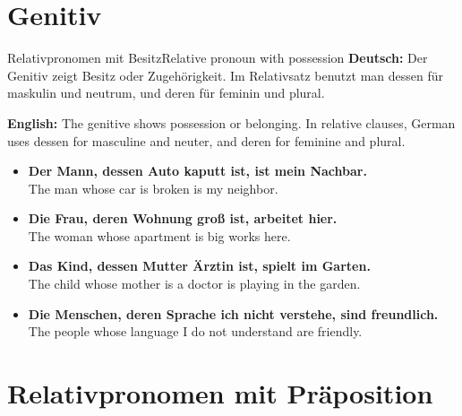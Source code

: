 \documentclass[a4paper,11pt]{article}
\newcommand{\GermanText}[1]{\textbf{Deutsch: }#1\par}
\newcommand{\EnglishText}[1]{{\small\color{SoftGray}\textbf{English: }#1\par}}
\newcommand{\ExampleItem}[2]{\item \textbf{#1}\\{\small\color{SoftGray}#2}}
\begin{document}
    
    \section{Genitiv}
        
        \begin{grammarentry}{Relativpronomen mit Besitz}{Relative pronoun with possession}
            \GermanText{Der Genitiv zeigt Besitz oder Zugehörigkeit. Im Relativsatz benutzt man dessen für maskulin und neutrum, und deren für feminin und plural.}
            \EnglishText{The genitive shows possession or belonging. In relative clauses, German uses dessen for masculine and neuter, and deren for feminine and plural.}
            
            \begin{exbox}
                \begin{itemize}
                    \ExampleItem{Der Mann, dessen Auto kaputt ist, ist mein Nachbar.}{The man whose car is broken is my neighbor.}
                    \ExampleItem{Die Frau, deren Wohnung groß ist, arbeitet hier.}{The woman whose apartment is big works here.}
                    \ExampleItem{Das Kind, dessen Mutter Ärztin ist, spielt im Garten.}{The child whose mother is a doctor is playing in the garden.}
                    \ExampleItem{Die Menschen, deren Sprache ich nicht verstehe, sind freundlich.}{The people whose language I do not understand are friendly.}
                \end{itemize}
            \end{exbox}
        \end{grammarentry}
    
    
    \section{Relativpronomen mit Präposition}
        
\end{document}
